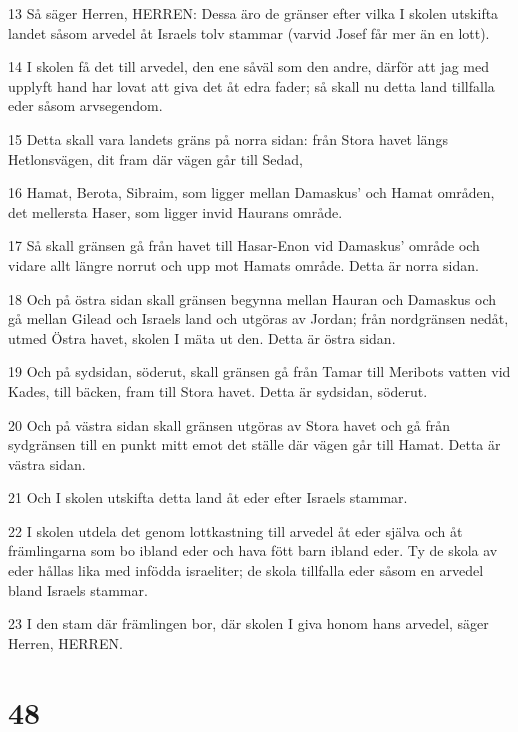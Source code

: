 \par 13 Så säger Herren, HERREN: Dessa äro de gränser efter vilka I skolen utskifta landet såsom arvedel åt Israels tolv stammar (varvid Josef får mer än en lott).
\par 14 I skolen få det till arvedel, den ene såväl som den andre, därför att jag med upplyft hand har lovat att giva det åt edra fader; så skall nu detta land tillfalla eder såsom arvsegendom.
\par 15 Detta skall vara landets gräns på norra sidan: från Stora havet längs Hetlonsvägen, dit fram där vägen går till Sedad,
\par 16 Hamat, Berota, Sibraim, som ligger mellan Damaskus' och Hamat områden, det mellersta Haser, som ligger invid Haurans område.
\par 17 Så skall gränsen gå från havet till Hasar-Enon vid Damaskus' område och vidare allt längre norrut och upp mot Hamats område. Detta är norra sidan.
\par 18 Och på östra sidan skall gränsen begynna mellan Hauran och Damaskus och gå mellan Gilead och Israels land och utgöras av Jordan; från nordgränsen nedåt, utmed Östra havet, skolen I mäta ut den. Detta är östra sidan.
\par 19 Och på sydsidan, söderut, skall gränsen gå från Tamar till Meribots vatten vid Kades, till bäcken, fram till Stora havet. Detta är sydsidan, söderut.
\par 20 Och på västra sidan skall gränsen utgöras av Stora havet och gå från sydgränsen till en punkt mitt emot det ställe där vägen går till Hamat. Detta är västra sidan.
\par 21 Och I skolen utskifta detta land åt eder efter Israels stammar.
\par 22 I skolen utdela det genom lottkastning till arvedel åt eder själva och åt främlingarna som bo ibland eder och hava fött barn ibland eder. Ty de skola av eder hållas lika med infödda israeliter; de skola tillfalla eder såsom en arvedel bland Israels stammar.
\par 23 I den stam där främlingen bor, där skolen I giva honom hans arvedel, säger Herren, HERREN.

\chapter{48}

